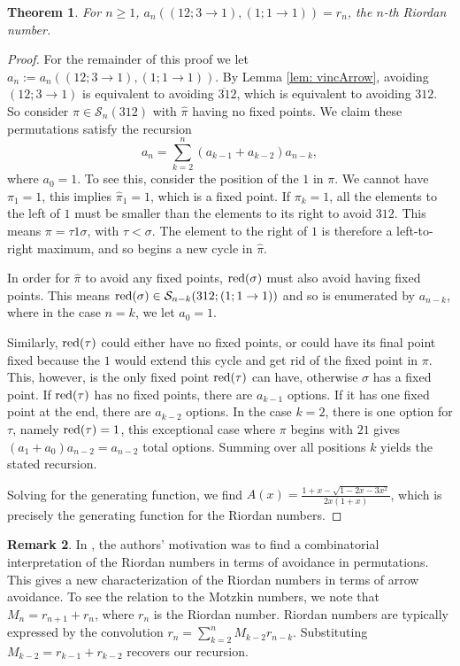 \documentclass[11pt]{article}
\newcommand{\ol}[1]{\overline{#1}}
\renewcommand\S{\mathcal S}
\newtheorem{theorem}{Theorem}[section]
\theoremstyle{definition}
\newtheorem{remark}[theorem]{Remark}
\begin{document}
\begin{theorem} \label{thm: 12t11t13}
    For $n \geq 1$, $a_n((12;3 \to 1), (1; 1\to1)) = r_n$, the $n$-th Riordan number.
\end{theorem}

\begin{proof}
    For the remainder of this proof we let $a_n := a_n((12;3 \to 1),(1; 1\to1))$. By Lemma \ref{lem: vincArrow}, avoiding $(12; 3 \to 1)$ is equivalent to avoiding $\ol{31}2$, which is equivalent to avoiding $312$. So consider $\pi \in \S_n(312)$ with $\hat\pi$ having no fixed points. We claim these permutations satisfy the recursion 
    \[
    a_n = \sum_{k=2}^{n} (a_{k-1} + a_{k-2})a_{n-k},
    \]
    where $a_0 = 1$. To see this, consider the position of the $1$ in $\pi$. We cannot have $\pi_1 = 1$, this implies $\hat\pi_1 = 1$, which is a fixed point. If $\pi_k = 1$, all the elements to the left of $1$ must be smaller than the elements to its right to avoid $312$. This means $\pi = \tau 1\sigma$, with $\tau < \sigma$. The element to the right of $1$ is therefore a left-to-right maximum, and so begins a new cycle in $\hat\pi$. 
    
    In order for $\hat\pi$ to avoid any fixed points, ${\rm red}(\sigma)$ must also avoid having fixed points. This means ${\rm red}(\sigma) \in \S_{n-k}(312; (1; 1\to1))$ and so is enumerated by $a_{n-k}$, where in the case $n = k$, we let $a_0 = 1$. 
    
    Similarly, ${\rm red}(\tau)$ could either have no fixed points, or could have its final point fixed because the $1$ would extend this cycle and get rid of the fixed point in $\pi$. This, however, is the only fixed point ${\rm red}(\tau)$ can have, otherwise $\sigma$ has a fixed point. If ${\rm red}(\tau)$ has no fixed points, there are $a_{k-1}$ options. If it has one fixed point at the end, there are $a_{k-2}$ options. In the case $k = 2$, there is one option for $\tau$, namely ${\rm red}(\tau) = 1$, this exceptional case where $\pi$ begins with $21$ gives $(a_{1} + a_0)a_{n-2} = a_{n-2}$ total options. Summing over all positions $k$ yields the stated recursion.

    Solving for the generating function, we find $A(x) = \frac{1 + x - \sqrt{1 - 2x - 3x^2}}{2x(1+x)}$, which is precisely the generating function for the Riordan numbers.
\end{proof}

\begin{remark}
    In \cite{CDY08}, the authors' motivation was to find a combinatorial interpretation of the Riordan numbers in terms of avoidance in permutations. This gives a new characterization of the Riordan numbers in terms of arrow avoidance. To see the relation to the Motzkin numbers, we note that $M_n = r_{n+1} + r_n$, where $r_n$ is the Riordan number. Riordan numbers are typically expressed by the convolution $r_n = \sum_{k=2}^n M_{k-2}r_{n-k}$. Substituting $M_{k-2} = r_{k-1} + r_{k-2}$ recovers our recursion. 
\end{remark}
\end{document}
